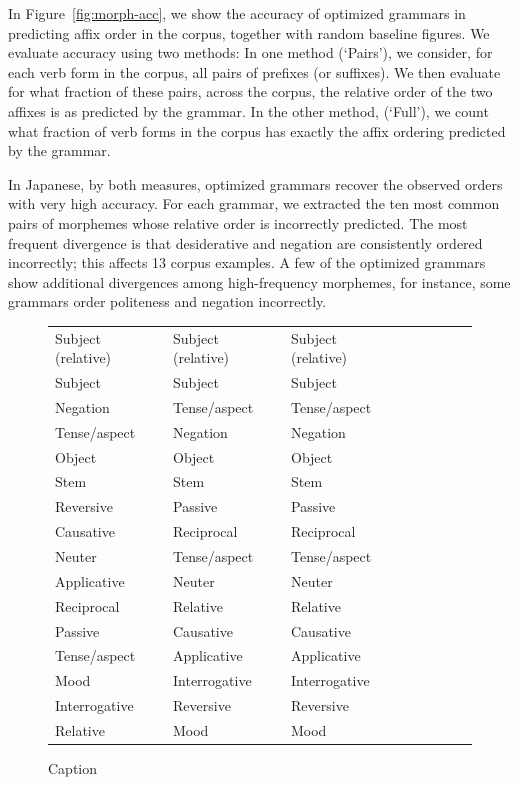 In Figure~\ref{fig:morph-acc}, we show the accuracy of optimized grammars in predicting affix order in the corpus, together with random baseline figures.
We evaluate accuracy using two methods:
In one method (`Pairs'), we consider, for each verb form in the corpus, all pairs of prefixes (or suffixes).
We then evaluate for what fraction of these pairs, across the corpus, the relative order of the two affixes is as predicted by the grammar.
In the other method, (`Full'), we count what fraction of verb forms in the corpus has exactly the affix ordering predicted by the grammar.





In Japanese, by both measures, optimized grammars recover the observed orders with very high accuracy.
For each grammar, we extracted the ten most common pairs of morphemes whose relative order is incorrectly predicted.
The most frequent divergence is that desiderative and negation are consistently ordered incorrectly; this affects 13 corpus examples.
A few of the optimized grammars show additional divergences among high-frequency morphemes, for instance, some grammars order politeness and negation incorrectly. 



\begin{figure}
    \centering
    \begin{tabular}{llllllll}
    Subject (relative) & Subject (relative) & Subject (relative) \\
Subject & Subject & Subject \\
Negation & Tense/aspect & Tense/aspect \\
Tense/aspect & Negation & Negation \\
Object & Object & Object \\
Stem & Stem & Stem \\
Reversive & Passive & Passive \\
Causative & Reciprocal & Reciprocal \\
Neuter & Tense/aspect & Tense/aspect \\
Applicative & Neuter & Neuter \\
Reciprocal & Relative & Relative \\
Passive & Causative & Causative \\
Tense/aspect & Applicative & Applicative \\
Mood & Interrogative & Interrogative \\
Interrogative & Reversive & Reversive \\
Relative & Mood & Mood \\
    \end{tabular}
    \caption{Caption}
    \label{fig:my_label}
\end{figure}


